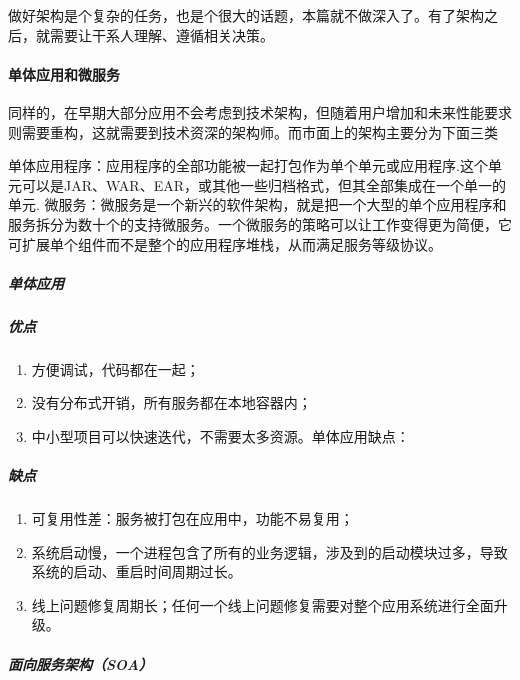 \documentclass[letterpaper,11pt,english]{sphinxmanual}
\begin{document}
做好架构是个复杂的任务，也是个很大的话题，本篇就不做深入了。有了架构之后，就需要让干系人理解、遵循相关决策。


\paragraph{单体应用和微服务}
\label{\detokenize{chapter_idea/understand_tech:id14}}
同样的，在早期大部分应用不会考虑到技术架构，但随着用户增加和未来性能要求则需要重构，这就需要到技术资深的架构师。而市面上的架构主要分为下面三类

单体应用程序：应用程序的全部功能被一起打包作为单个单元或应用程序.这个单元可以是JAR、WAR、EAR，或其他一些归档格式，但其全部集成在一个单一的单元.
微服务：微服务是一个新兴的软件架构，就是把一个大型的单个应用程序和服务拆分为数十个的支持微服务。一个微服务的策略可以让工作变得更为简便，它可扩展单个组件而不是整个的应用程序堆栈，从而满足服务等级协议。


\subparagraph{单体应用}
\label{\detokenize{chapter_idea/understand_tech:id15}}

\subparagraph{优点}
\label{\detokenize{chapter_idea/understand_tech:id16}}\begin{enumerate}
%
\item {} 
方便调试，代码都在一起；

\item {} 
没有分布式开销，所有服务都在本地容器内；

\item {} 
中小型项目可以快速迭代，不需要太多资源。单体应用缺点：

\end{enumerate}


\subparagraph{缺点}
\label{\detokenize{chapter_idea/understand_tech:id17}}\begin{enumerate}
%
\item {} 
可复用性差：服务被打包在应用中，功能不易复用；

\item {} 
系统启动慢，一个进程包含了所有的业务逻辑，涉及到的启动模块过多，导致系统的启动、重启时间周期过长。

\item {} 
线上问题修复周期长；任何一个线上问题修复需要对整个应用系统进行全面升级。

\end{enumerate}


\subparagraph{面向服务架构（SOA）}
\label{\detokenize{chapter_idea/understand_tech:soa}}\label{\detokenize{chapter_idea/understand_tech:id19}}\label{\detokenize{chapter_idea/understand_tech:id18}}
\end{document}
